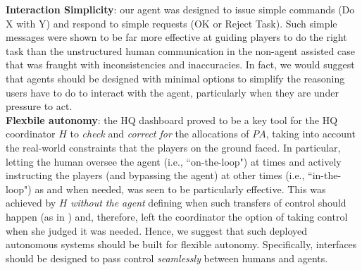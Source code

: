 \noindent \textbf{Interaction Simplicity}: our agent was designed to issue simple commands (Do X with Y) and respond to simple requests (OK or Reject Task). Such simple messages were shown to be far more effective at guiding players to do the right task than the unstructured human communication in the non-agent assisted case that was fraught with inconsistencies and inaccuracies. In fact, we would suggest that agents should be designed with minimal options to simplify the reasoning users have to do to interact with the agent, particularly when they are under pressure to act.\\

\noindent \textbf{Flexbile autonomy}: the HQ dashboard proved to be a key tool for the HQ coordinator $H$ to \emph{check} and \emph{correct for} the allocations of $PA$, taking into account the real-world constraints that the players on the ground faced. In particular, letting the human oversee the agent (i.e., ``on-the-loop") at times and actively instructing  the players (and bypassing the agent) at other times (i.e., ``in-the-loop") as and when needed, was seen to be particularly effective. This was achieved by $H$ \emph{without the agent} defining when such transfers of control should happen (as in \cite{scerri:etal:2005}) and, therefore, left the coordinator the option of taking control when she judged it was needed. Hence, we suggest that such deployed autonomous systems should be built for flexible autonomy. Specifically, interfaces should be designed to pass control \emph{seamlessly} between humans and agents.

